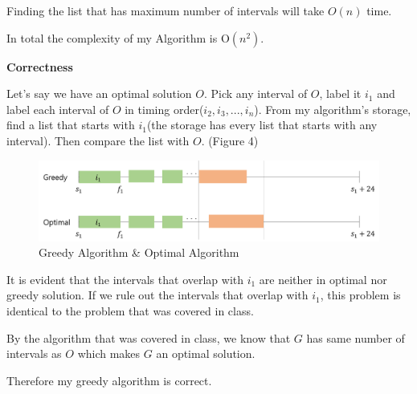 \documentclass[a4paper,11pt]{article}
\begin{document}
\begin{enumerate}
Finding the list that has maximum number of intervals will take $O(n)$ time.

In total the complexity of my Algorithm is O$(n^2)$.

{\bf Correctness}

Let's say we have an optimal solution $O$.
Pick any interval of $O$, label it $i_1$ and label each interval of $O$ in timing order($i_2, i_3, ..., i_n$).
From my algorithm's storage, find a list that starts with $i_1$(the storage has every list that starts with any interval).
Then compare the list with $O$. (Figure 4)

\begin{figure}[hbt]
	\centering
	\includegraphics[scale=0.4]{figure4.png}
	\caption{Greedy Algorithm \& Optimal Algorithm}
\end{figure}
It is evident that the intervals that overlap with $i_1$ are neither in optimal nor greedy solution.
If we rule out the intervals that overlap with $i_1$, this problem is identical to the problem that was covered in class.

By the algorithm that was covered in class, we know that $G$ has same number of intervals as $O$ which makes $G$ an optimal solution.

Therefore my greedy algorithm is correct.
\end{enumerate}
\end{document}
